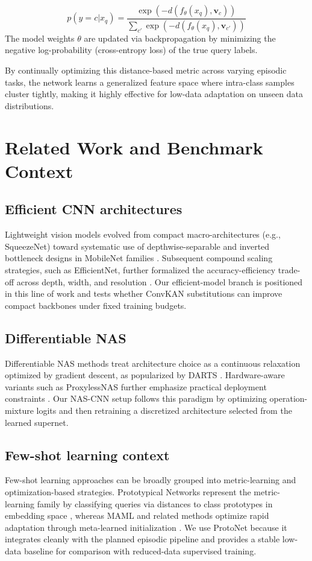 \documentclass[cameraready]{Interspeech}
\begin{document}
\begin{itemize}
\begin{enumerate}
        $$ p(y=c|x_q) = \frac{\exp(-d(f_\theta(x_q), \mathbf{v}_c))}{\sum_{c'} \exp(-d(f_\theta(x_q), \mathbf{v}_{c'}))} $$
        The model weights $\theta$ are updated via backpropagation by minimizing the negative log-probability (cross-entropy loss) of the true query labels.
    \end{enumerate}
    By continually optimizing this distance-based metric across varying episodic tasks, the network learns a generalized feature space where intra-class samples cluster tightly, making it highly effective for low-data adaptation on unseen data distributions.
\end{itemize}

\section{Related Work and Benchmark Context}
\subsection{Efficient CNN architectures}
Lightweight vision models evolved from compact macro-architectures (e.g., SqueezeNet) toward systematic use of depthwise-separable and inverted bottleneck designs in MobileNet families \cite{SqueezeNet,sandler2018mobilenetv2,Howard_2019_ICCV}. Subsequent compound scaling strategies, such as EfficientNet, further formalized the accuracy-efficiency trade-off across depth, width, and resolution \cite{tan2019efficientnet}. Our efficient-model branch is positioned in this line of work and tests whether ConvKAN substitutions can improve compact backbones under fixed training budgets.

\subsection{Differentiable NAS}
Differentiable NAS methods treat architecture choice as a continuous relaxation optimized by gradient descent, as popularized by DARTS \cite{liu2018darts}. Hardware-aware variants such as ProxylessNAS further emphasize practical deployment constraints \cite{cai2018proxylessnas}. Our NAS-CNN setup follows this paradigm by optimizing operation-mixture logits and then retraining a discretized architecture selected from the learned supernet.

\subsection{Few-shot learning context}
Few-shot learning approaches can be broadly grouped into metric-learning and optimization-based strategies. Prototypical Networks represent the metric-learning family by classifying queries via distances to class prototypes in embedding space \cite{NIPS2017_cb8da676}, whereas MAML and related methods optimize rapid adaptation through meta-learned initialization \cite{finn2017maml}. We use ProtoNet because it integrates cleanly with the planned episodic pipeline and provides a stable low-data baseline for comparison with reduced-data supervised training.
\end{document}
